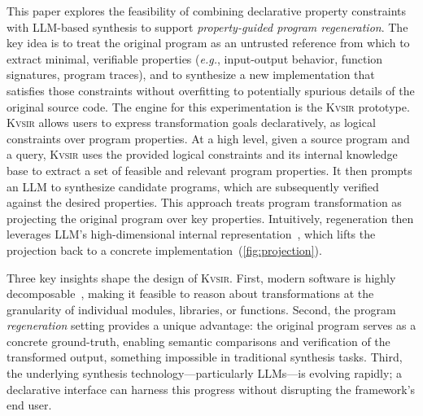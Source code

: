 \documentclass[sigplan,review,anonymous,10pt]{acmart}
\def\eg{{\em e.g.}, }
\newcommand{\sys}{{\scshape Kv{\textalpha}sir}\xspace}
\begin{document}
This paper explores the feasibility of combining declarative property
constraints with LLM-based synthesis to support \emph{property-guided program regeneration}.
The key idea is to treat the original program as an untrusted reference from
which to extract minimal, verifiable properties (\eg input-output behavior,
function signatures, program traces), and to synthesize a new implementation that satisfies those
constraints without overfitting to potentially spurious details of the original source code.
The engine for this experimentation is the \sys prototype.
\sys allows users
to express transformation goals declaratively, as logical constraints over
program properties.
At a high level, given a source program and a query, \sys uses the provided
logical constraints and its internal knowledge base to extract a set of
feasible and relevant program properties.
It then prompts an LLM to synthesize
candidate programs, which are subsequently verified against the desired properties.
This approach treats program transformation as projecting the original program over key properties.
Intuitively, regeneration then leverages LLM's high-dimensional internal representation~\cite{jin2024emergent,tao2024llms,huh2024platonicrepresentationhypothesis}, 
which lifts the projection back to a concrete implementation~(\cref{fig:projection}).

Three key insights shape the design of \sys.
First, modern software is highly decomposable~\cite{vfunction2024modular, isoline2018decomposition, schechter2011visualizing, breakapp:ndss:2018}, making it feasible to reason about transformations at the granularity of individual modules, libraries, or functions.
Second, the program \emph{regeneration} setting provides a unique advantage: the original program serves as a concrete ground-truth, enabling semantic comparisons and verification of the transformed output, something impossible in traditional synthesis tasks.
Third, the underlying synthesis technology---particularly LLMs---is evolving rapidly; a declarative interface can harness this progress without disrupting the framework's end user.

\end{document}
